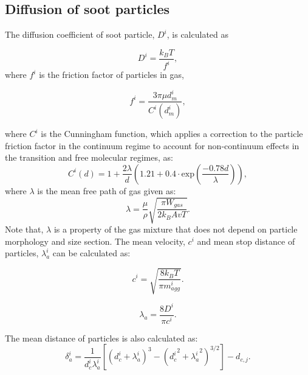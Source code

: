 \subsection{Diffusion of soot particles}

The diffusion coefficient of soot particle, $D^i$, is calculated as

\begin{equation}
	D^i = \frac{k_B T}{f^i}
	\label{eqn:diff},
\end{equation}
\noindent where $f^i$ is the friction factor of particles in gas,

\begin{equation}
	f^i = \frac{3\pi\mu d^i_m}{C^i(d^i_m)}
	\label{eqn:fraction},
\end{equation}

\noindent where ${C^i}$ is the Cunningham function, which applies a correction to the particle friction factor in the continuum regime to account for non-continuum effects in the transition and free molecular regimes, as: 
\begin{equation}
	C^i(d) = 1+\frac{2\lambda}{d}
	\left(
	1.21+0.4\cdot\mathrm{exp}(\frac{-0.78d}{\lambda})
	\right)
	\label{eqn:cun},
\end{equation}
\noindent where $\lambda$ is the mean free path of gas given as:
\begin{equation}
	\lambda = \frac{\mu}{\rho}\sqrt{\frac{\pi W_{gas}}{2k_B Av T}}
	\label{eqn:lambda}.
\end{equation}
Note that, $\lambda$ is a property of the gas mixture that does not depend on particle morphology and size section. The mean velocity, ${c^i}$ and mean stop distance of particles, ${\lambda^i_a}$ can be calculated as:

\begin{equation}
	c^i = \sqrt{\frac{8k_B T}{\pi m^i_{agg}}}
	\label{eqn:meanvel}.
\end{equation}

\begin{equation}
	\lambda_a = \frac{8D^i}{\pi c^i}
	\label{eqn:stopdist}.
\end{equation}

The mean distance of particles is also calculated as:
\begin{equation}
	\delta^i_a=\frac{1}{d^i_c\lambda^i_a}
	\left[
		\left(
			d^i_c+\lambda^i_a
		\right)^3
		-\left(
			{d^i_c}^2+{\lambda^i_a}^2
		\right)^{3 / 2}
	\right]
	-d_{c, j}    
	\label{eqn:meandist}.
\end{equation}


